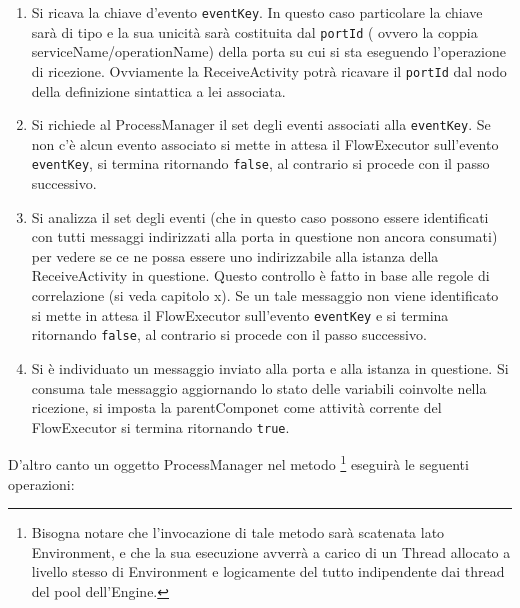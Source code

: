 \begin{enumerate}
  \item Si ricava la chiave d'evento \texttt{eventKey}. In questo caso
  particolare la chiave sarà di tipo  e la sua
  unicità sarà costituita dal \texttt{portId} ( ovvero la coppia 
  serviceName/operationName) della porta su cui si sta eseguendo l'operazione di 
  ricezione. Ovviamente la ReceiveActivity potrà ricavare il \texttt{portId}
  dal nodo della definizione sintattica a lei associata.
  
  \item Si richiede al ProcessManager il set degli eventi associati alla
  \texttt{eventKey}. Se non c'è alcun evento associato si mette in attesa il
  FlowExecutor sull'evento \texttt{eventKey}, si termina ritornando
  \texttt{false}, al contrario si procede con il passo successivo.
  
  \item Si analizza il set degli eventi (che in questo caso possono essere
  identificati con tutti messaggi indirizzati alla porta in questione non
  ancora consumati) per vedere se ce ne possa essere uno indirizzabile alla
  istanza della ReceiveActivity in questione. Questo controllo \`e fatto in
  base alle regole di correlazione (si veda capitolo x). Se un tale messaggio
  non viene identificato si mette in attesa il FlowExecutor sull'evento \texttt{eventKey} e si termina
  ritornando \texttt{false}, al contrario si procede con il passo successivo.
  
  \item Si \`e individuato un messaggio inviato alla porta e alla istanza in
  questione. Si consuma tale messaggio aggiornando lo stato delle variabili
  coinvolte nella ricezione, si imposta la parentComponet come attività
  corrente del FlowExecutor si termina ritornando \texttt{true}.
\end{enumerate}

D'altro canto un oggetto ProcessManager nel metodo \footnote{Bisogna notare che
l'invocazione di tale metodo sarà scatenata lato Environment, e che la sua
esecuzione avverrà a carico di un Thread allocato a livello stesso di
Environment e logicamente del tutto indipendente dai thread del pool
dell'Engine.} eseguirà le seguenti operazioni:

